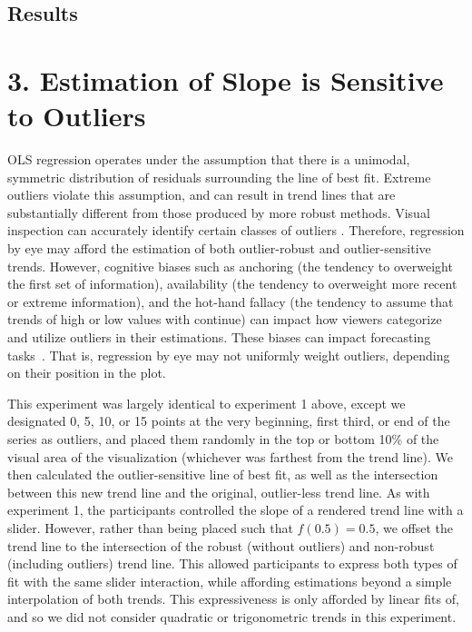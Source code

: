 \documentclass{sigchi}
\begin{document}
\subsection{Results}

\section{3. Estimation of Slope is Sensitive to Outliers}

OLS regression operates under the assumption that there is a unimodal, symmetric distribution of residuals surrounding the line of best fit. Extreme outliers violate this assumption, and can result in trend lines that are substantially different from those produced by more robust methods. Visual inspection can accurately identify certain classes of outliers \cite{albers2014task}. Therefore, regression by eye may afford the estimation of both outlier-robust and outlier-sensitive trends. However, cognitive biases such as anchoring (the tendency to overweight the first set of information), availability (the tendency to overweight more recent or extreme information), and the hot-hand fallacy (the tendency to assume that trends of high or low values with continue) can impact how viewers categorize and utilize outliers in their estimations. These biases can impact forecasting tasks~\cite{campbell2009anchoring,ji2001culture}. That is, regression by eye may not uniformly weight outliers, depending on their position in the plot.

This experiment was largely identical to experiment 1 above, except we designated 0, 5, 10, or 15 points at the very beginning, first third, or end of the series as outliers, and placed them randomly in the top or bottom 10\% of the visual area of the visualization (whichever was farthest from the trend line). We then calculated the outlier-sensitive line of best fit, as well as the intersection between this new trend line and the original, outlier-less trend line. As with experiment 1, the participants controlled the slope of a rendered trend line with a slider. However, rather than being placed such that $f(0.5)=0.5$, we offset the trend line to the intersection of the robust (without outliers) and non-robust (including outliers) trend line. This allowed participants to express both types of fit with the same slider interaction, while affording estimations beyond a simple interpolation of both trends. This expressiveness is only afforded by linear fits of, and so we did not consider quadratic or trigonometric trends in this experiment.
\end{document}
